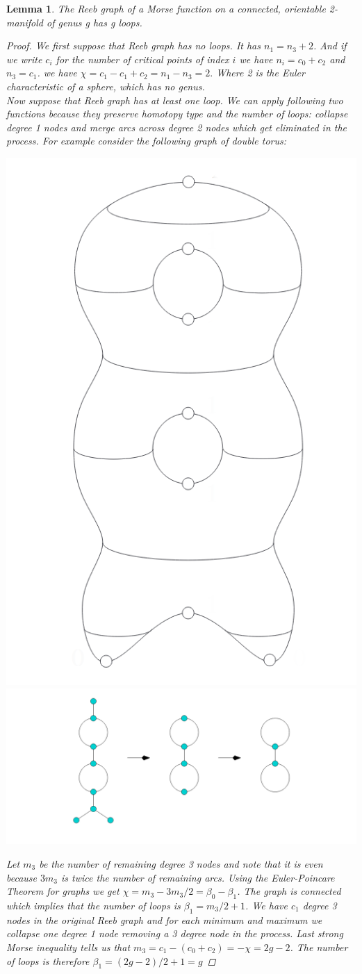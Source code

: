 \documentclass[]{article}
\newtheorem{lemma}{Lemma}
\begin{document}
\begin{lemma}
    The Reeb graph of a Morse function on a connected, orientable 2-manifold of genus g has g loops.
    \begin{proof}
        We first suppose that Reeb graph has no loops. It has $n_1 = n_3+2$. And if we write $c_i$ for the number of critical points of index $i$ we have $n_i = c_0+c_2$ and $n_3 = c_1$. we have $\chi = c_1 - c_1 +c_2 = n_1 - n_3 = 2.$  Where 2 is the Euler characteristic of a sphere, which has no genus. \\ 
        Now suppose that Reeb graph has at least one loop. We can apply following two functions because they preserve homotopy type and the number of loops: collapse degree 1 nodes and merge arcs across degree 2 nodes which get eliminated in the process. For example consider the following graph of double torus:
    \begin{center}

        \includegraphics[width=.2\textwidth]{2-tori.png}
        \includegraphics[width=.7\textwidth]{homotopic_transformation.png}
    \end{center}
    Let $m_3$ be the number of remaining degree 3 nodes and note that it is even because $3m_3$ is twice the number of remaining arcs. Using the Euler-Poincare Theorem for graphs we get $\chi = m_3 - 3m_3/2 = \beta_0 - \beta_1$. The graph is connected which implies that the number of loops is $\beta_1 = m_3/2+1$. We have $c_1$ degree 3 nodes in the original Reeb graph and for each minimum and maximum we collapse one degree 1 node removing a 3 degree node in the process. Last strong Morse inequality tells us that $m_3 = c_1 - (c_0 + c_2) = -\chi = 2g - 2$. The number of loops is therefore $ \beta_1 = (2g-2)/2+1=g$
    \end{proof}
\end{lemma}
\end{document}
